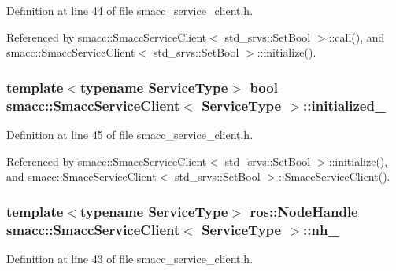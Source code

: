 Definition at line 44 of file smacc\+\_\+service\+\_\+client.\+h.



Referenced by smacc\+::\+Smacc\+Service\+Client$<$ std\+\_\+srvs\+::\+Set\+Bool $>$\+::call(), and smacc\+::\+Smacc\+Service\+Client$<$ std\+\_\+srvs\+::\+Set\+Bool $>$\+::initialize().

\subsubsection[{\texorpdfstring{initialized\+\_\+}{initialized_}}]{\setlength{\rightskip}{0pt plus 5cm}template$<$typename Service\+Type$>$ {\bf bool} {\bf smacc\+::\+Smacc\+Service\+Client}$<$ Service\+Type $>$\+::initialized\+\_\+\hspace{0.3cm}{\ttfamily [protected]}}\hypertarget{classsmacc_1_1SmaccServiceClient_a251b147a783f05d13edb272b85f64982}{}\label{classsmacc_1_1SmaccServiceClient_a251b147a783f05d13edb272b85f64982}


Definition at line 45 of file smacc\+\_\+service\+\_\+client.\+h.



Referenced by smacc\+::\+Smacc\+Service\+Client$<$ std\+\_\+srvs\+::\+Set\+Bool $>$\+::initialize(), and smacc\+::\+Smacc\+Service\+Client$<$ std\+\_\+srvs\+::\+Set\+Bool $>$\+::\+Smacc\+Service\+Client().

\subsubsection[{\texorpdfstring{nh\+\_\+}{nh_}}]{\setlength{\rightskip}{0pt plus 5cm}template$<$typename Service\+Type$>$ ros\+::\+Node\+Handle {\bf smacc\+::\+Smacc\+Service\+Client}$<$ Service\+Type $>$\+::nh\+\_\+\hspace{0.3cm}{\ttfamily [protected]}}\hypertarget{classsmacc_1_1SmaccServiceClient_a6e5e8b77b4c7137f9c820b09c8f661b5}{}\label{classsmacc_1_1SmaccServiceClient_a6e5e8b77b4c7137f9c820b09c8f661b5}


Definition at line 43 of file smacc\+\_\+service\+\_\+client.\+h.



